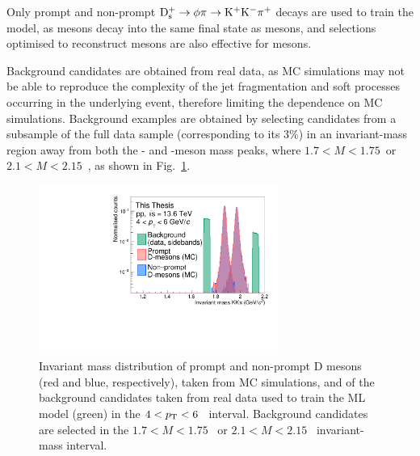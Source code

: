 Only prompt and non-prompt \mbox{$\mathrm{D_s^+} \rightarrow \phi \pi \rightarrow \mathrm{K^+K^-\pi^+}$} decays are used to train the model, as \dpl mesons decay into the same final state as \ds mesons, and selections optimised to reconstruct \ds mesons are also effective for \dpl mesons. 

Background candidates are obtained from real data, as MC simulations may not be able to reproduce the complexity of the jet fragmentation and soft processes occurring in the underlying event, therefore limiting the dependence on MC simulations. Background examples are obtained by selecting candidates from a subsample of the full data sample (corresponding to its 3\%) in an invariant-mass region away from both the \ds- and \dpl-meson mass peaks, where $1.7 < M < 1.75$~\gevcc or \mbox{$2.1 < M < 2.15$~\gevcc}, as shown in Fig.~\ref{fig:ml_training_mass}. 
\begin{figure}[htb]
    \centering
    \includegraphics[width=0.7\textwidth]{Figures/Chapter 5/Mass.pdf}
    \caption{Invariant mass distribution of prompt and non-prompt D mesons (red and blue, respectively), taken from MC simulations, and of the background candidates taken from real data used to train the ML model (green) in the \mbox{$4<p_\mathrm{T}<6$~\gevc} interval. Background candidates are selected in the \mbox{$1.7 < M < 1.75$~\gevcc} or \mbox{$2.1 < M < 2.15$~\gevcc} invariant-mass interval.}
    \label{fig:ml_training_mass}
\end{figure}

